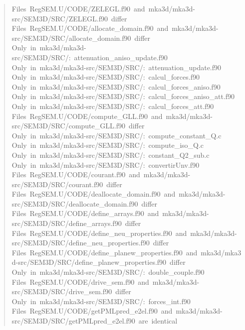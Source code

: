\documentclass[10pt,a4paper,english]{article}
\begin{document}
\begin{quote}
{Files~RegSEM.U/CODE/ZELEGL.f90~and~mka3d/mka3d-src/SEM3D/SRC/ZELEGL.f90~differ~\\
Files~RegSEM.U/CODE/allocate{\_}domain.f90~and~mka3d/mka3d-src/SEM3D/SRC/allocate{\_}domain.f90~differ~\\
Only~in~mka3d/mka3d-src/SEM3D/SRC/:~attenuation{\_}aniso{\_}update.f90~\\
Only~in~mka3d/mka3d-src/SEM3D/SRC/:~attenuation{\_}update.f90~\\
Only~in~mka3d/mka3d-src/SEM3D/SRC/:~calcul{\_}forces.f90~\\
Only~in~mka3d/mka3d-src/SEM3D/SRC/:~calcul{\_}forces{\_}aniso.f90~\\
Only~in~mka3d/mka3d-src/SEM3D/SRC/:~calcul{\_}forces{\_}aniso{\_}att.f90~\\
Only~in~mka3d/mka3d-src/SEM3D/SRC/:~calcul{\_}forces{\_}att.f90~\\
Files~RegSEM.U/CODE/compute{\_}GLL.f90~and~mka3d/mka3d-src/SEM3D/SRC/compute{\_}GLL.f90~differ~\\
Only~in~mka3d/mka3d-src/SEM3D/SRC/:~compute{\_}constant{\_}Q.c~\\
Only~in~mka3d/mka3d-src/SEM3D/SRC/:~compute{\_}iso{\_}Q.c~\\
Only~in~mka3d/mka3d-src/SEM3D/SRC/:~constant{\_}Q2{\_}sub.c~\\
Only~in~mka3d/mka3d-src/SEM3D/SRC/:~convertirUnv.f90~\\
Files~RegSEM.U/CODE/courant.f90~and~mka3d/mka3d-src/SEM3D/SRC/courant.f90~differ~\\
Files~RegSEM.U/CODE/deallocate{\_}domain.f90~and~mka3d/mka3d-src/SEM3D/SRC/deallocate{\_}domain.f90~differ~\\
Files~RegSEM.U/CODE/define{\_}arrays.f90~and~mka3d/mka3d-src/SEM3D/SRC/define{\_}arrays.f90~differ~\\
Files~RegSEM.U/CODE/define{\_}neu{\_}properties.f90~and~mka3d/mka3d-src/SEM3D/SRC/define{\_}neu{\_}properties.f90~differ~\\
Files~RegSEM.U/CODE/define{\_}planew{\_}properties.f90~and~mka3d/mka3d-src/SEM3D/SRC/define{\_}planew{\_}properties.f90~differ~\\
Only~in~mka3d/mka3d-src/SEM3D/SRC/:~double{\_}couple.f90~\\
Files~RegSEM.U/CODE/drive{\_}sem.f90~and~mka3d/mka3d-src/SEM3D/SRC/drive{\_}sem.f90~differ~\\
Only~in~mka3d/mka3d-src/SEM3D/SRC/:~forces{\_}int.f90~\\
Files~RegSEM.U/CODE/getPMLpred{\_}e2el.f90~and~mka3d/mka3d-src/SEM3D/SRC/getPMLpred{\_}e2el.f90~are~identical~\\
}
\end{quote}
\end{document}

